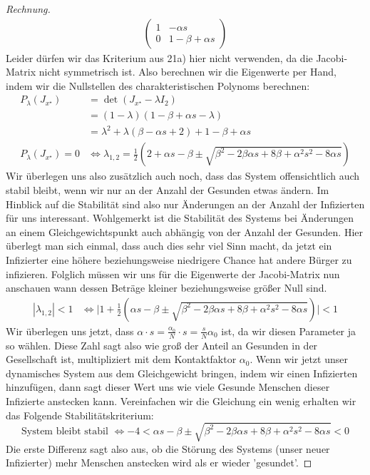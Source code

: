\documentclass[a4paper]{article}
\begin{document}
\begin{theorem}
\begin{proof}[Rechnung]
\begin{align*}
\begin{pmatrix}
			1 & - \alpha s \\
			0 & 1 - \beta + \alpha s
		\end{pmatrix} 
	\end{align*}
	Leider dürfen wir das Kriterium aus 21a) hier nicht verwenden, da die Jacobi-Matrix nicht symmetrisch ist.
	Also berechnen wir die Eigenwerte per Hand, indem wir die Nullstellen des charakteristischen Polynoms
	berechnen:
	\begin{align*}
		P_\lambda (J_{x ^{\star}}) &=
		\det (J_{x ^{\star}} - \lambda I_2) \\
			   &= (1 - \lambda) (1 - \beta + \alpha s - \lambda ) \\
			   &= \lambda ^2 + \lambda \left(
				\beta - \alpha s + 2
			   \right) + 1 - \beta + \alpha s \\
		P_\lambda (J_{x ^{\star}}) = 0 & \Leftrightarrow
		\lambda_{1, 2} = \frac{ 1 }{ 2 } \left(
			2 + \alpha s - \beta \pm \sqrt{
				\beta ^2 - 2 \beta \alpha s + 8 \beta + \alpha ^2 s ^2 - 8 \alpha s
			} 
		\right) 
	\end{align*}
	Wir überlegen uns also zusätzlich auch noch, dass das System offensichtlich auch stabil bleibt,
	wenn wir nur an der Anzahl der Gesunden etwas ändern. Im Hinblick auf die Stabilität sind
	also nur Änderungen an der Anzahl der Infizierten für uns interessant.
	Wohlgemerkt ist die Stabilität des Systems bei Änderungen an einem Gleichgewichtspunkt
	auch abhängig von der Anzahl der Gesunden. Hier überlegt man sich einmal, dass auch dies sehr
	viel Sinn macht, da jetzt ein Infizierter eine höhere beziehungsweise niedrigere Chance
	hat andere Bürger zu infizieren.
	Folglich müssen wir uns für die Eigenwerte der Jacobi-Matrix nun anschauen wann dessen Beträge
	kleiner beziehungsweise größer Null sind.
	\begin{align*}
		| \lambda_{1, 2} | < 1 & \Leftrightarrow
		\Big | 1 + \frac{ 1 }{ 2 } \left(
			\alpha s - \beta \pm \sqrt{
				\beta ^2 - 2 \beta \alpha s + 8 \beta + \alpha ^2 s ^2 - 8 \alpha s
			} 
		\right) \Big | < 1
	\end{align*}
	Wir überlegen uns jetzt, dass $\alpha \cdot s = \frac{ \alpha_0 }{ N } \cdot s = \frac{ s }{ N } \alpha_0$
	ist, da wir
	diesen Parameter ja so wählen. Diese Zahl sagt also wie groß der Anteil an Gesunden in der Gesellschaft
	ist, multipliziert mit dem Kontaktfaktor $\alpha_0$. Wenn wir jetzt unser dynamisches System aus dem
	Gleichgewicht bringen, indem wir einen Infizierten hinzufügen, dann sagt dieser Wert uns wie viele
	Gesunde Menschen dieser Infizierte anstecken kann. 
	Vereinfachen wir die Gleichung ein wenig erhalten wir das Folgende Stabilitätskriterium:
	\[
	\text{System bleibt stabil } \Leftrightarrow
	-4 < \alpha s - \beta \pm \sqrt{
		\beta ^2 - 2 \beta \alpha s + 8 \beta + \alpha ^2 s ^2 - 8 \alpha s
	} < 0
	\] 
	Die erste Differenz sagt also aus, ob die Störung des Systems (unser neuer Infizierter) mehr Menschen
	anstecken wird als er wieder 'gesundet'. 
\end{proof}
\end{theorem}
\end{document}
